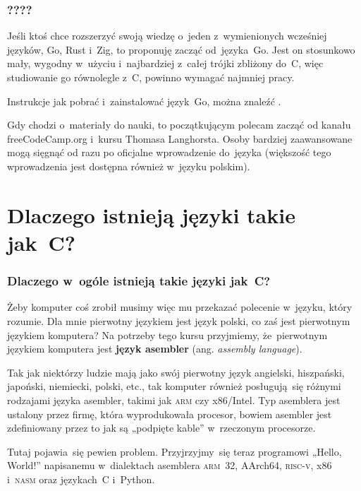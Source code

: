 \documentclass[10pt,t]{beamer}
\begin{document}
\begin{frame}
  \frametitle{????}


  Jeśli ktoś chce rozszerzyć swoją wiedzę o~jeden z~wymienionych wcześniej
  języków, Go, Rust i~Zig, to proponuję zacząć od~języka~Go. Jest on
  stosunkowo mały, wygodny w~użyciu i~najbardziej z~całej trójki zbliżony
  do~C, więc studiowanie go równolegle z~C, powinno wymagać najmniej pracy.

  Instrukcje jak pobrać i~zainstalować język~Go, można znaleźć
  .

  Gdy chodzi o~materiały do nauki, to początkującym polecam zacząć od
   kanału freeCodeCamp.org
  i~kursu
   Thomasa Langhorsta. Osoby bardziej
  zaawansowane mogą sięgnąć od razu po oficjalne wprowadzenie do~języka
  (większość tego wprowadzenia jest dostępna również w~języku polskim).

\end{frame}










\section{Dlaczego istnieją języki takie jak~C?}



\begin{frame}
  \frametitle{Dlaczego w~ogóle istnieją takie języki jak~C?}

  \pause


  Żeby komputer coś zrobił musimy więc mu przekazać polecenie w~języku,
  który rozumie. Dla mnie pierwotny językiem jest język polski, co zaś
  jest pierwotnym językiem komputera? Na potrzeby tego kursu przyjmiemy,
  że~pierwotnym językiem komputera jest \textbf{język asembler}
  (ang. \textit{assembly language}).

  Tak jak niektórzy ludzie mają jako swój pierwotny język angielski,
  hiszpański, japoński, niemiecki, polski, etc., tak komputer również
  posługują~się różnymi rodzajami języka asembler, takimi jak \textsc{arm}
  czy x86/Intel. Typ asemblera jest ustalony przez firmę, która
  wyprodukowała procesor, bowiem asembler jest zdefiniowany przez to jak są
  „podpięte kable” w~rzeczonym procesorze.

  Tutaj pojawia~się pewien problem. Przyjrzyjmy~się teraz programowi
  „Hello, World!” napisanemu w~dialektach asemblera \textsc{arm}~32,
  AArch64, \textsc{risc-v}, x86 i~\textsc{nasm} oraz językach~C
  i~Python.

\end{frame}
\end{document}

